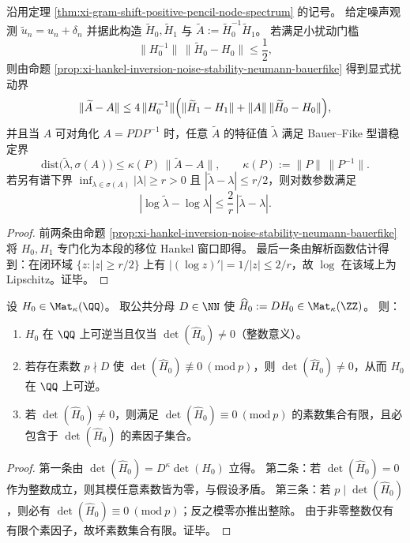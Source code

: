 \begin{corollary}\label{cor:xi-node-spectrum-noise-stability}
沿用定理 \ref{thm:xi-gram-shift-positive-pencil-node-spectrum} 的记号。
给定噪声观测 \(\tilde u_n=u_n+\delta_n\) 并据此构造 \(\widetilde H_0,\widetilde H_1\) 与 \(\widetilde A:=\widetilde H_0^{-1}\widetilde H_1\)。
若满足小扰动门槛
\[
\|H_0^{-1}\|\,\|\widetilde H_0-H_0\|\le \frac12,
\]
则由命题 \ref{prop:xi-hankel-inversion-noise-stability-neumann-bauerfike} 得到显式扰动界
\[
\|\widetilde A-A\|
\le 4\,\|H_0^{-1}\|\Bigl(\|\widetilde H_1-H_1\|+\|A\|\,\|\widetilde H_0-H_0\|\Bigr),
\]
并且当 \(A\) 可对角化 \(A=PDP^{-1}\) 时，任意 \(\widetilde A\) 的特征值 \(\widetilde\lambda\) 满足 Bauer--Fike 型谱稳定界
\[
\mathrm{dist}\bigl(\widetilde\lambda,\sigma(A)\bigr)\le \kappa(P)\,\|\widetilde A-A\|,
\qquad \kappa(P):=\|P\|\,\|P^{-1}\|.
\]
若另有谱下界 \(\inf_{\lambda\in\sigma(A)}|\lambda|\ge r>0\) 且 \(|\widetilde\lambda-\lambda|\le r/2\)，则对数参数满足
\[
|\log\widetilde\lambda-\log\lambda|\le \frac{2}{r}\,|\widetilde\lambda-\lambda|.
\]
\end{corollary}
\begin{proof}
前两条由命题 \ref{prop:xi-hankel-inversion-noise-stability-neumann-bauerfike} 将 \(H_0,H_1\) 专门化为本段的移位 Hankel 窗口即得。
最后一条由解析函数估计得到：在闭环域 \(\{z:|z|\ge r/2\}\) 上有 \(|(\log z)'|=1/|z|\le 2/r\)，故 \(\log\) 在该域上为 Lipschitz。证毕。
\end{proof}



\begin{proposition}\label{prop:xi-hankel-fullrank-one-prime-audit}
设 \(H_0\in \Mat_\kappa(\QQ)\)。
取公共分母 \(D\in\NN\) 使 \(\widehat H_0:=DH_0\in \Mat_\kappa(\ZZ)\)。
则：
\begin{enumerate}
  \item \(H_0\) 在 \(\QQ\) 上可逆当且仅当 \(\det(\widehat H_0)\neq 0\)（整数意义）。
  \item 若存在素数 \(p\nmid D\) 使 \(\det(\widehat H_0)\not\equiv 0\ (\mathrm{mod}\ p)\)，则 \(\det(\widehat H_0)\neq 0\)，从而 \(H_0\) 在 \(\QQ\) 上可逆。
  \item 若 \(\det(\widehat H_0)\neq 0\)，则满足 \(\det(\widehat H_0)\equiv 0\ (\mathrm{mod}\ p)\) 的素数集合有限，且必包含于 \(\det(\widehat H_0)\) 的素因子集合。
\end{enumerate}
\end{proposition}
\begin{proof}
第一条由 \(\det(\widehat H_0)=D^\kappa\det(H_0)\) 立得。
第二条：若 \(\det(\widehat H_0)=0\) 作为整数成立，则其模任意素数皆为零，与假设矛盾。
第三条：若 \(p\mid \det(\widehat H_0)\)，则必有 \(\det(\widehat H_0)\equiv 0\ (\mathrm{mod}\ p)\)；反之模零亦推出整除。
由于非零整数仅有有限个素因子，故坏素数集合有限。证毕。
\end{proof}


